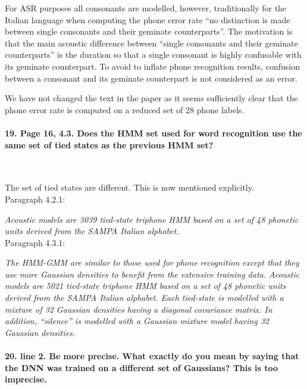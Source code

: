 \documentclass[]{article}
\begin{document}
For ASR  purposes all  consonants are modelled,  however, traditionally
for  the Italian  language when  computing the  phone error  rate ``no                                                    
distinction  is  made between  single  consonants  and their  geminate                                                    
counterparts''. The  motivation is  that the main  acoustic difference
between ``single  consonants and their geminate  counterparts'' is the
duration  so that  a single  consonant is  highly confusable  with its
geminate counterpart.  To avoid to inflate  phone recognition results,
confusion  between a  consonant and  its geminate  counterpart  is not
considered as an error.

We have  not changed the  text in the  paper as it  seems sufficiently
clear that  the phone error rate is  computed on a reduced  set of 28
phone labels.


\paragraph{19. Page 16, 4.3. Does the HMM set used for word recognition use the same set of tied states as the previous HMM set?}

~

The set of tied states are different. This is now mentioned explicitly.\\
Paragraph 4.2.1:

\textit{Acoustic models  are 3039 tied-state triphone HMM based on a set of 48 phonetic units derived from the SAMPA Italian alphabet.}
\\
Paragraph 4.3.1:

\textit{The HMM-GMM are similar to those used for phone recognition except that they use more Gaussian densities to benefit from the extensive training data. Acoustic models  are 5021 tied-state triphone HMM based on a set of  48 phonetic units  derived from the  SAMPA Italian alphabet. Each tied-state is modelled with  a mixture of  32 Gaussian densities   having  a  diagonal   covariance  matrix. In  addition, ``silence''  is  modelled  with  a  Gaussian mixture  model  having  32 Gaussian densities.}
\paragraph{20. line 2. Be more precise. What exactly do you mean by saying that the DNN was trained on a different set of Gaussians? This is too imprecise.}

~
\end{document}
